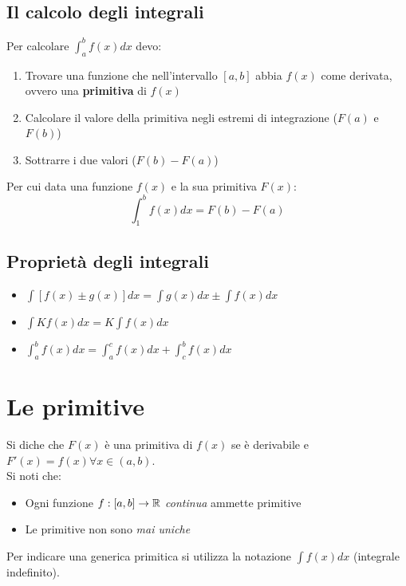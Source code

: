 \documentclass[12pt, a4paper, openany]{book}
\begin{document}
	\subsection{Il calcolo degli integrali}
	Per calcolare $\int_{a}^{b} f(x) dx$ devo:
	\begin{enumerate}
		\item Trovare una funzione che nell'intervallo $[a,b]$ abbia $f(x)$ come derivata, ovvero una \textbf{primitiva} di $f(x)$
		\item Calcolare il valore della primitiva negli estremi di integrazione ($F(a)$ e $F(b)$)
		\item Sottrarre i due valori ($F(b)-F(a)$)
	\end{enumerate}
	Per cui data una funzione $f(x)$ e la sua primitiva $F(x)$: $$\int_{1}^{b} f(x)dx = F(b)- F(a)$$


	\subsection{Proprietà degli integrali}
	\begin{itemize}
		\item $\int[f(x) \pm g(x)] dx = \int g(x) dx \pm \int f(x) dx$
		\item $\int K f(x) dx = K\int f(x) dx$
		\item $\int_{a}^{b} f(x) dx = \int_{a}^{c} f(x) dx + \int_{c}^{b} f(x) dx$
	\end{itemize}

	\section{Le primitive}
	Si diche che $F(x)$ è una primitiva di $f(x)$ se è derivabile e $F'(x) = f(x) \forall x\in (a,b)$.
	\\Si noti che:
	\begin{itemize}
		\item Ogni funzione $f:[a,b] \to \mathbb{R}$ \emph{continua} ammette primitive
		\item Le primitive non sono \emph{mai uniche}
	\end{itemize}
	Per indicare una generica primitica si utilizza la notazione $\int f(x) dx$ (integrale indefinito).
\end{document}
